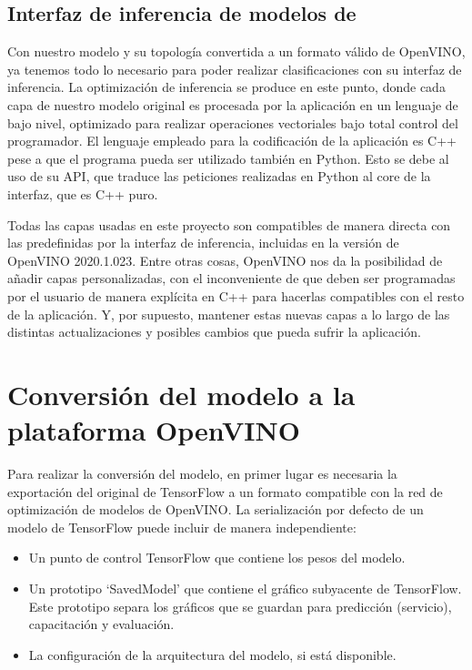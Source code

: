 \subsection{Interfaz de inferencia de modelos de }
\label{subsec:interfaz-de-infernecia-de-modelos-de-deep-learning}
Con nuestro modelo y su topología convertida a un formato válido de OpenVINO, ya tenemos todo lo necesario para poder realizar clasificaciones con su interfaz de inferencia\@.
La optimización de inferencia se produce en este punto, donde cada capa de nuestro modelo original es procesada por la aplicación en un lenguaje de bajo nivel, optimizado para realizar operaciones vectoriales bajo total control del programador.
El lenguaje empleado para la codificación de la aplicación es C++ pese a que el programa pueda ser utilizado también en Python.
Esto se debe al uso de su API, que traduce las peticiones realizadas en Python al core de la interfaz, que es C++ puro.

Todas las capas usadas en este proyecto son compatibles de manera directa con las predefinidas por la interfaz de inferencia, incluidas en la versión de OpenVINO 2020.1.023.
Entre otras cosas, OpenVINO nos da la posibilidad de añadir capas personalizadas, con el inconveniente de que deben ser programadas por el usuario de manera explícita en C++ para hacerlas compatibles con el resto de la aplicación.
Y, por supuesto, mantener estas nuevas capas a lo largo de las distintas actualizaciones y posibles cambios que pueda sufrir la aplicación.


\section{Conversión del modelo a la plataforma OpenVINO}\label{sec:conversión-del-modelo-a-la-plataforma-OpenVINO}
Para realizar la conversión del modelo, en primer lugar es necesaria la exportación del original de TensorFlow a un formato compatible con la red de optimización de modelos de OpenVINO\@.
La serialización por defecto de un modelo de TensorFlow puede incluir de manera independiente:

\begin{itemize}
    \item Un punto de control TensorFlow que contiene los pesos del modelo.
    \item Un prototipo `SavedModel' que contiene el gráfico subyacente de TensorFlow.
    Este prototipo separa los gráficos que se guardan para predicción (servicio), capacitación y evaluación.
    \item La configuración de la arquitectura del modelo, si está disponible.
\end{itemize}

